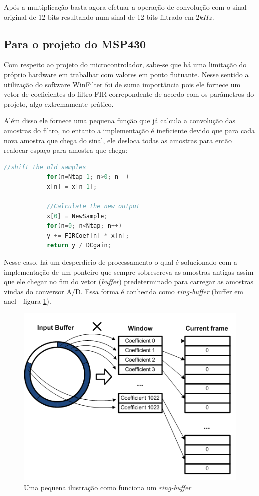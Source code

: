		Após a multiplicação basta agora efetuar a operação de convolução com o sinal original de 12 bits resultando num sinal de 12 bits filtrado em $ 2kHz $.
	
	\subsection{Para o projeto do MSP430}
		
		Com respeito ao projeto do microcontrolador, sabe-se que há uma limitação do próprio hardware em trabalhar com valores em ponto flutuante. Nesse sentido a utilização do software WinFilter foi de suma importância pois ele fornece um vetor de coeficientes do filtro FIR correpondente de acordo com os parâmetros do projeto, algo extremamente prático.
		
		Além disso ele fornece uma pequena função que já calcula a convolução das amostras do filtro, no entanto a implementação é ineficiente devido que para cada nova amostra que chega do sinal, ele desloca todas as amostras para então realocar espaço para amostra que chega:
		
		\begin{lstlisting}[caption={Código Gerado no WinFilter para um filtro FIR},label={lst:cod-winfilter01},language=C]
			//shift the old samples
			for(n=Ntap-1; n>0; n--)
			x[n] = x[n-1];
			
			//Calculate the new output
			x[0] = NewSample;
			for(n=0; n<Ntap; n++)
			y += FIRCoef[n] * x[n];
			return y / DCgain;
		\end{lstlisting}
		
		Nesse caso, há um desperdício de processamento o qual é solucionado com a implementação de um ponteiro que sempre sobrescreva as amostras antigas assim que ele chegar no fim do vetor (\textit{buffer}) predeterminado para carregar as amostras vindas do conversor A/D. Essa forma é conhecida como \textit{ring-buffer} (buffer em anel - figura \ref{fig-ringbuffer}).
		
		\begin{figure}[!ht]
			\centering
			\includegraphics[scale=0.5]{./figuras/ringbuffer.png}
			\caption{Uma pequena ilustração como funciona um \textit{ring-buffer}}
			\label{fig-ringbuffer}
		\end{figure}
		
